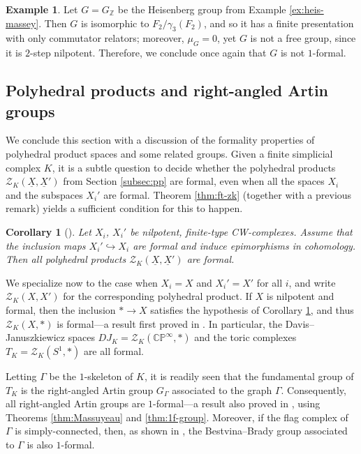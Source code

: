 \documentclass{article}
\numberwithin{equation}{section}
\newtheorem{corollary}[theorem]{Corollary}
\theoremstyle{definition}
\newtheorem{example}[theorem]{Example}
\newcommand{\Z}{\mathbb{Z}}
\newcommand{\CP}{\mathbb{CP}}
\newcommand{\ZZ}{{\mathcal{Z}}}
\newcommand{\inj}{\hookrightarrow}
\newcommand{\uX}{\underline{X}}
\begin{document}
\begin{example}
\label{ex:heis-bis}
Let $G=G_{\Z}$ be the Heisenberg group from 
Example \ref{ex:heis-massey}. Then $G$ is isomorphic to 
$F_2/\gamma_3(F_2)$, and so it has a finite 
presentation with only commutator relators; moreover, 
$\mu_G=0$, yet  $G$ is not a free group, since it is 
$2$-step nilpotent. Therefore, we conclude once again 
that $G$ is not $1$-formal. 
\end{example}

\subsection{Polyhedral products and right-angled Artin groups}
\label{subsec:zk-raag}
We conclude this section with a discussion of the formality 
properties of polyhedral product spaces and some related 
groups. Given a finite simplicial complex $K$,  it is a 
subtle question to decide whether the polyhedral products 
$\ZZ_{K}(\uX,\uX')$ from Section \ref{subsec:pp} are formal, 
even when all the spaces $X_i$ and the subspaces $X_i'$ 
are formal. Theorem \ref{thm:ft-zk} (together with a previous 
remark) yields a sufficient condition for this to happen.

\begin{corollary}[\cite{FT09}]
\label{cor:formal-zk}
Let $X_i^{}$, $X_i'$ be nilpotent, finite-type CW-complexes.
Assume that the inclusion maps $X_i'\inj X_i$ are formal 
and induce epimorphisms in cohomology.  
Then all polyhedral products $\ZZ_{K}(\uX,\uX')$ are formal.
\end{corollary}

We specialize now to the case when $X_i=X$ and $X_i'=X'$ 
for all $i$, and write $\ZZ_{K}(X,X')$ for the corresponding 
polyhedral product.
If $X$ is nilpotent and formal, then the inclusion 
$* \to X$ satisfies the hypothesis of 
Corollary \ref{cor:formal-zk}, and thus  $\ZZ_K(X,*)$
is formal---a result first proved in \cite{NR}. In particular, 
the Davis--Januszkiewicz spaces 
$DJ_K= \ZZ_K(\CP^{\infty},*)$ and the 
toric complexes $T_K=\ZZ_K(S^1,*)$ are all formal.

Letting $\Gamma$ be the $1$-skeleton of $K$, 
it is readily seen that the fundamental group of 
$T_K$ is the right-angled Artin group $G_{\Gamma}$ 
associated to the graph $\Gamma$. Consequently, 
all right-angled Artin groups are $1$-formal---a result 
also proved in \cite{PS-mathann}, using 
Theorems \ref{thm:Massuyeau} and \ref{thm:1f-group}. 
Moreover, if the flag complex of $\Gamma$ is 
simply-connected, then, as shown in \cite{PS-jlms07}, 
the Bestvina--Brady group associated to $\Gamma$ is 
also $1$-formal.
\end{document}
